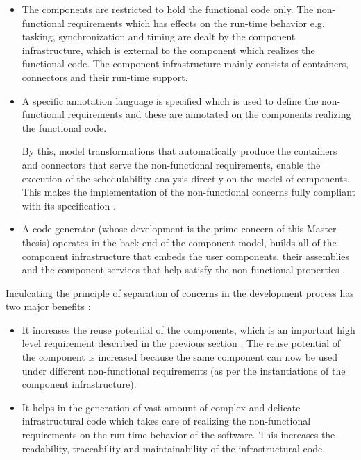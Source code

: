 \begin{description}
\begin{itemize}
\item The components are restricted to hold the functional code only. The non-functional requirements which has effects on the run-time behavior e.g. tasking, synchronization and timing are dealt by the component infrastructure, which is external to the component which realizes the functional code. The component infrastructure mainly consists of containers, connectors and their run-time support.

\item A specific annotation language is specified which is used to define the non-functional requirements and these are annotated on the components realizing the functional code.

By this, model transformations that automatically produce the containers and connectors that serve the non-functional requirements, enable the execution of the schedulability analysis directly on the model of components. This makes the implementation of the non-functional concerns fully compliant with its specification \cite{ScheduAnaly}. 

\item A code generator (whose development is the prime concern of this Master thesis) operates in the back-end of the component model, builds all of the component infrastructure that embeds the user components, their assemblies and the component services that help satisfy the non-functional properties \cite{CharEvoRAVCodeAr}. 
\end{itemize}

Inculcating the principle of separation of concerns in the development process has two major benefits \cite{CompBasedProcess}:

\begin{itemize}
\item It increases the reuse potential of the components, which is an important high level requirement described in the previous section \cite{SAVOIR}. The reuse potential of the component is increased because the same component can now be used under different non-functional requirements (as per the instantiations of the component infrastructure).

\item It helps in the generation of vast amount of complex and delicate infrastructural code which takes care of realizing the non-functional requirements on the run-time behavior of the software. This increases the readability, traceability and maintainability of the infrastructural code. 
\end{itemize}


\end{description}
